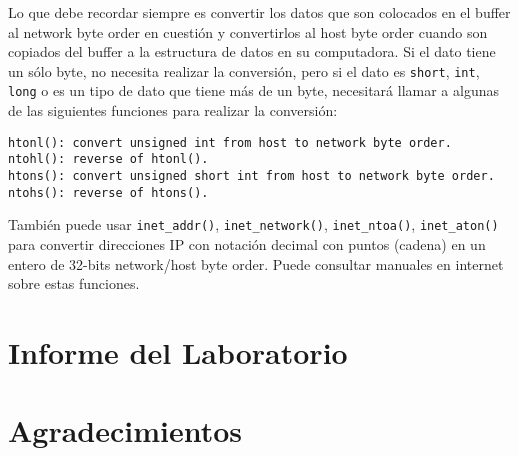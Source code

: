 Lo que debe recordar siempre es convertir los datos que son colocados en el buffer al network byte order en cuestión y convertirlos al host byte order cuando son copiados del buffer a la estructura de datos en su computadora. Si el dato tiene un sólo byte, no necesita realizar la conversión, pero si el dato es {\tt short}, 
{\tt int}, {\tt long} o es un tipo de dato que tiene más de un byte, necesitará llamar a algunas de las siguientes funciones para realizar la conversión:

\begin{lstlisting}
htonl(): convert unsigned int from host to network byte order.
ntohl(): reverse of htonl().
htons(): convert unsigned short int from host to network byte order.
ntohs(): reverse of htons().
\end{lstlisting}


También puede usar {\tt inet\_addr()}, {\tt inet\_network()},
{\tt inet\_ntoa()}, {\tt inet\_aton()} para convertir direcciones IP con notación decimal con puntos (cadena) en un entero de 32-bits network/host byte order.  Puede consultar manuales en internet sobre estas funciones.

\section{Informe del Laboratorio}



\section*{Agradecimientos}








